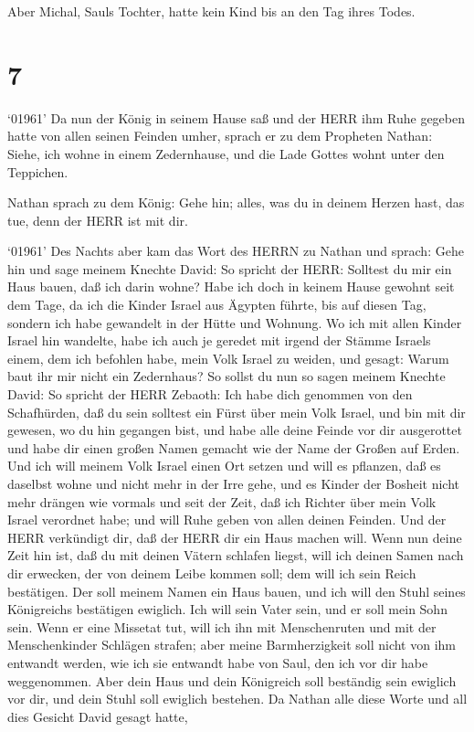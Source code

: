  Aber Michal, Sauls Tochter, hatte kein Kind bis an den Tag
ihres Todes.

\hypertarget{section-6}{%
\section{7}\label{section-6}}

 `01961' Da nun der König in seinem Hause saß und der HERR
ihm Ruhe gegeben hatte von allen seinen Feinden umher, 
sprach er zu dem Propheten Nathan: Siehe, ich wohne in einem
Zedernhause, und die Lade Gottes wohnt unter den Teppichen.

 Nathan sprach zu dem König: Gehe hin; alles, was du in
deinem Herzen hast, das tue, denn der HERR ist mit dir.

 `01961' Des Nachts aber kam das Wort des HERRN zu Nathan
und sprach:  Gehe hin und sage meinem Knechte David: So
spricht der HERR: Solltest du mir ein Haus bauen, daß ich darin wohne?
 Habe ich doch in keinem Hause gewohnt seit dem Tage, da ich
die Kinder Israel aus Ägypten führte, bis auf diesen Tag, sondern ich
habe gewandelt in der Hütte und Wohnung.  Wo ich mit allen
Kinder Israel hin wandelte, habe ich auch je geredet mit irgend der
Stämme Israels einem, dem ich befohlen habe, mein Volk Israel zu weiden,
und gesagt: Warum baut ihr mir nicht ein Zedernhaus?  So
sollst du nun so sagen meinem Knechte David: So spricht der HERR
Zebaoth: Ich habe dich genommen von den Schafhürden, daß du sein
solltest ein Fürst über mein Volk Israel,  und bin mit dir
gewesen, wo du hin gegangen bist, und habe alle deine Feinde vor dir
ausgerottet und habe dir einen großen Namen gemacht wie der Name der
Großen auf Erden.  Und ich will meinem Volk Israel einen
Ort setzen und will es pflanzen, daß es daselbst wohne und nicht mehr in
der Irre gehe, und es Kinder der Bosheit nicht mehr drängen wie vormals
und seit der Zeit, daß ich Richter über mein Volk Israel verordnet habe;
 und will Ruhe geben von allen deinen Feinden. Und der HERR
verkündigt dir, daß der HERR dir ein Haus machen will. 
Wenn nun deine Zeit hin ist, daß du mit deinen Vätern schlafen liegst,
will ich deinen Samen nach dir erwecken, der von deinem Leibe kommen
soll; dem will ich sein Reich bestätigen.  Der soll meinem
Namen ein Haus bauen, und ich will den Stuhl seines Königreichs
bestätigen ewiglich.  Ich will sein Vater sein, und er soll
mein Sohn sein. Wenn er eine Missetat tut, will ich ihn mit
Menschenruten und mit der Menschenkinder Schlägen strafen; 
aber meine Barmherzigkeit soll nicht von ihm entwandt werden, wie ich
sie entwandt habe von Saul, den ich vor dir habe weggenommen.
 Aber dein Haus und dein Königreich soll beständig sein
ewiglich vor dir, und dein Stuhl soll ewiglich bestehen. 
Da Nathan alle diese Worte und all dies Gesicht David gesagt hatte,

